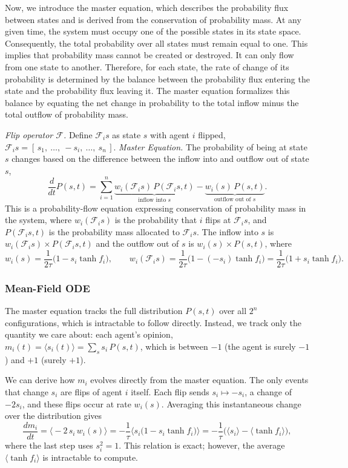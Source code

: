 Now, we introduce the master equation, which describes the probability flux between states and
is derived from the conservation of probability mass. At any given time, the system must occupy
one of the possible states in its state space. Consequently, the total probability over all
states must remain equal to one. This implies that probability mass cannot be created or
destroyed. It can only flow from one state to another. Therefore, for each state, the rate of change of its probability is determined by the balance between the probability flux entering the state and the probability flux leaving it. The master equation formalizes this balance by equating the net change in probability to the total inflow minus the total outflow of probability mass.

\textit{Flip operator $\mathcal{F}$.} Define $\mathcal{F}_i s$ as state $s$ with agent $i$ flipped,
\(
\mathcal{F}_i s = [\,s_1,\ \ldots,\ -s_i,\ \ldots,\ s_n\,].
\)
\textit{Master Equation.} The probability of being at state $s$ changes based on the difference
between the inflow into and outflow out of state $s$,
\[
\frac{d}{dt}P(s,t) = \sum_{i=1}^{n}
\underbrace{w_i(\mathcal{F}_i s)\,P(\mathcal{F}_i s, t)}_{\text{inflow into } s}
- \underbrace{w_i(s)\,P(s,t)}_{\text{outflow out of } s}.
\]
This is a probability-flow equation expressing conservation of probability mass in the system,
where $w_i(\mathcal{F}_i s)$ is the probability that $i$ flips at $\mathcal{F}_i s$, and $P(\mathcal{F}_i s, t)$ is the
probability mass allocated to $\mathcal{F}_i s$. The inflow into $s$ is $w_i(\mathcal{F}_i s)\times P(\mathcal{F}_i s, t)$
and the outflow out of $s$ is $w_i(s)\times P(s,t)$, where
\[
w_i(s) = \frac{1}{2\tau}\big(1 - s_i \tanh f_i\big),
\qquad
w_i(\mathcal{F}_i s) = \frac{1}{2\tau}\big(1 - (-s_i)\tanh f_i\big)
= \frac{1}{2\tau}\big(1 + s_i \tanh f_i\big).
\]

\subsubsection{Mean-Field ODE}

The master equation tracks the full distribution $P(s,t)$ over all $2^n$ configurations, which
is intractable to follow directly. Instead, we track only the quantity we care about: each
agent's opinion, 
$m_i(t) = \langle s_i(t)\rangle = \sum_s s_i\,P(s,t)$, which is between
$-1$ (the agent is surely $-1$) and $+1$ (surely $+1$).

We can derive how $m_i$ evolves directly from the master equation. The only events that change $s_i$ are flips of agent $i$ itself. Each flip sends $s_i \mapsto -s_i$, a change of $-2s_i$, and these flips occur at rate $w_i(s)$. Averaging this
instantaneous change over the distribution gives
\[
\frac{d m_i}{dt}
= \big\langle -2\,s_i\,w_i(s)\big\rangle
= -\frac{1}{\tau}\big\langle s_i\big(1 - s_i \tanh f_i\big)\big\rangle
= -\frac{1}{\tau}\Big(\langle s_i\rangle - \big\langle \tanh f_i\big\rangle\Big),
\]
where the last step uses $s_i^2 = 1$. This relation is exact; however, the average
$\langle \tanh f_i\rangle$ is intractable to compute.


